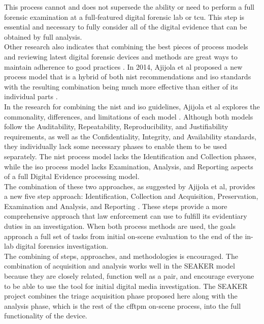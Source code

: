 \documentclass[12pt]{article}
\begin{document}
This process cannot and does not supersede the ability or need to perform a full forensic
examination at a full-featured digital forensic lab \cite{rogers2006computer} or \gls{tcu}.  This
step is essential and necessary to fully consider all of the digital evidence that can
be obtained by full analysis.\\

Other research also indicates that combining the best pieces of process models and reviewing
latest digital forensic devices and methods are great ways to maintain adherence to 
good practices \cite{ajijola2014review}.  In 2014, Ajijola et al proposed a new process model
that is a hybrid of both \gls{nist} recommendations and \gls{iso} standards
with the resulting combination being much more effective than either of its individual
parts \cite{ajijola2014review}.\\

In the research for combining the \gls{nist} and \gls{iso} guidelines, Ajijola et al
explores the commonality, differences, and limitations of each model \cite{ajijola2014review}.  Although both models
follow the Auditability, Repeatability, Reproducibility, and Justifiability requirements, as
well as the Confidentiality, Integrity, and Availability standards, they individually lack some
necessary phases to enable them to be used separately.  The \gls{nist} process model lacks the
Identification and Collection phases, while the \gls{iso} process model lacks Examination, Analysis,
and Reporting aspects of a full Digital Evidence processing model.\\

The combination of these two approaches, as suggested by Ajijola et al,
provides a new five step approach: Identification, Collection and Acquisition, Preservation,
Examination and Analysis, and Reporting \cite{ajijola2014review}. These steps provide a more comprehensive approach that
law enforcement can use to fulfill its evidentiary duties in an investigation.  When both
process methods are used, the goals approach a full set of tasks from initial on-scene
evaluation to the end of the in-lab digital forensics investigation.\\

The combining of steps, approaches, and methodologies is encouraged.  The combination of 
acquisition and analysis works well in the SEAKER model because they are closely related,
function well as a pair, and encourage everyone to be able to use the tool for initial digital
media investigation.  The SEAKER
project combines the triage acquisition phase proposed here along with the analysis
phase, which is the rest of the \gls{cfftpm} on-scene process, into the full functionality
of the device.\\
\end{document}

